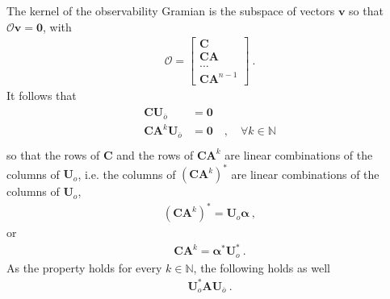 \documentclass[letterpaper,10pt,english]{jupyterBook}
\begin{document}
\sphinxAtStartPar
The kernel of the observability Gramian is the sub\sphinxhyphen{}space of vectors \(\mathbf{v}\) so that \(\mathscr{O} \mathbf{v} = \mathbf{0}\), with
\begin{equation*}
\begin{split}\mathscr{O} = \begin{bmatrix} \mathbf{C} \\ \mathbf{C} \mathbf{A} \\ \dots \\ \mathbf{C} \mathbf{A}^{n-1} \end{bmatrix} \ .\end{split}
\end{equation*}
\sphinxAtStartPar
It follows that
\begin{equation*}
\begin{split}\begin{aligned}
   \mathbf{C} \mathbf{U}_{\overline{o}} & = \mathbf{0} \\
   \mathbf{C} \mathbf{A}^k \mathbf{U}_{\overline{o}}  & = \mathbf{0} \quad , \quad \forall k \in \mathbb{N} \\
\end{aligned}\end{split}
\end{equation*}
\sphinxAtStartPar
so that the rows of \(\mathbf{C}\) and the rows of \(\mathbf{C} \mathbf{A}^k\) are linear combinations of the columns of \(\mathbf{U}_o\), i.e. the columns of \(\left( \mathbf{C} \mathbf{A}^k \right)^*\) are linear combinations of the columns of \(\mathbf{U}_o\),
\begin{equation*}
\begin{split}\left( \mathbf{C} \mathbf{A}^k \right)^* = \mathbf{U}_o \boldsymbol\alpha \ , \end{split}
\end{equation*}
\sphinxAtStartPar
or
\begin{equation*}
\begin{split}\mathbf{C} \mathbf{A}^k = \boldsymbol\alpha^* \mathbf{U}_o^* \ .\end{split}
\end{equation*}
\sphinxAtStartPar
As the property holds for every \(k \in \mathbb{N}\), the following holds as well
\begin{equation*}
\begin{split}\mathbf{U}_o^* \mathbf{A} \mathbf{U}_{\overline{o}} \ .\end{split}
\end{equation*}
\end{document}
